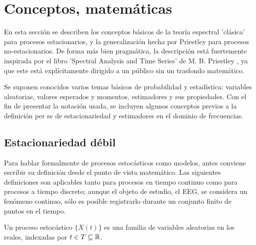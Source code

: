 
\section{Conceptos, matem\'aticas}

En esta secci\'on se describen los conceptos b\'asicos de la teor\'ia espectral 'cl\'asica' para 
procesos estacionarios, y la generalizaci\'on hecha por Priestley para procesos no-estacionarios. 
De forma m\'as bien pragm\'atica, la descripci\'on est\'a
 fuertemente inspirada por el libro 'Spectral Analysis and Time Series' 
de M. B. Priestley \cite{Priestley81}, ya que este est\'a expl\'icitamente dirigido a un p\'ublico 
sin un trasfondo matem\'atico.

Se suponen conocidos varios temas b\'asicos de probabilidad y estad\'istica:
variables aleatorias, valores esperados y momentos, estimadores y sus propiedades.
Con el fin de presentar la notaci\'on usada, se incluyen algunos conceptos previos a la 
definici\'on per se de estacionariedad y estimadores en el dominio de frecuencias.


\subsection{Estacionariedad d\'ebil}

Para hablar formalmente de procesos estoc\'asticos como modelos, antes 
conviene escribir su definici\'on desde el punto de vista matem\'atico. Las siguientes definiciones
son aplicables tanto para procesos en tiempo continuo
como para procesos a tiempo discreto; aunque el objeto de estudio, el EEG, se considera 
un fen\'omeno continuo, s\'olo es posible registrarlo durante un conjunto finito de puntos 
en el tiempo.

\begin{defn}
Un proceso estoc\'astico $\{ X(t) \}$ es una familia de variables aleatorias 
en los reales,
indexadas por
$t \in T \subseteq \mathbb{R}$.
\end{defn}

